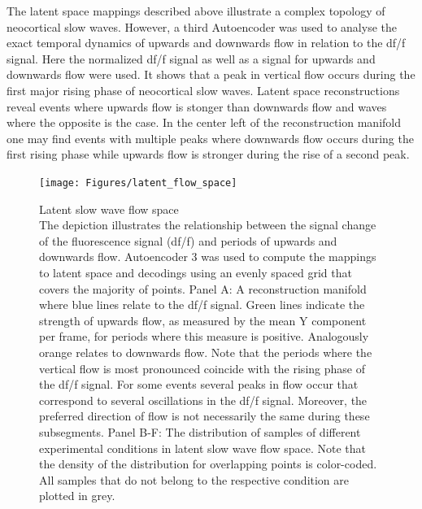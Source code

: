 The latent space mappings described above illustrate a complex topology of neocortical slow waves. However, a third Autoencoder was used to analyse the exact temporal dynamics of upwards and downwards flow in relation to the df/f signal. Here the normalized df/f signal as well as a signal for upwards and downwards flow were used. It shows that a peak in vertical flow occurs during the first major rising phase of neocortical slow waves. Latent space reconstructions reveal events where upwards flow is stonger than downwards flow and waves where the opposite is the case. In the center left of the reconstruction manifold one may find events with multiple peaks where downwards flow occurs during the first rising phase while upwards flow is stronger during the rise of a second peak.\\

\begin{figure}[!htb]
\centering
\texttt{[image: Figures/latent\_flow\_space]}
\decoRule
\caption[Latent slow wave flow space]{Latent slow wave flow space\\ The depiction illustrates the relationship between the signal change of the fluorescence signal (df/f) and periods of upwards and downwards flow. Autoencoder 3 was used to compute the mappings to latent space and decodings using an evenly spaced grid that covers the majority of points. Panel A: A reconstruction manifold where blue lines relate to the df/f signal. Green lines indicate the strength of upwards flow, as measured by the mean Y component per frame, for periods where this measure is positive. Analogously orange relates to downwards flow. Note that the periods where the vertical flow is most pronounced coincide with the rising phase of the df/f signal. For some events several peaks in flow occur that correspond to several oscillations in the df/f signal. Moreover, the preferred direction of flow is not necessarily the same during these subsegments. Panel B-F: The distribution of samples of different experimental conditions in latent slow wave flow space. Note that the density of the distribution for overlapping points is color-coded. All samples that do not belong to the respective condition are plotted in grey.}
\label{fig:latent_flow_space}
\end{figure}

